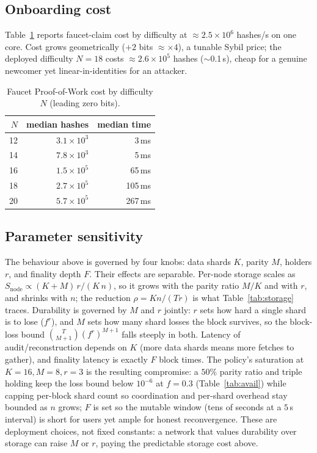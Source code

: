 \subsection{Onboarding cost}
Table~\ref{tab:pow} reports faucet-claim cost by difficulty at $\approx 2.5\times10^{6}$
hashes/s on one core. Cost grows geometrically ($+2$ bits $\approx \times4$), a tunable Sybil
price; the deployed difficulty $N{=}18$ costs $\approx 2.6\times10^{5}$ hashes ($\sim$0.1\,s),
cheap for a genuine newcomer yet linear-in-identities for an attacker.

\begin{table}[t]
\centering
\caption{Faucet Proof-of-Work cost by difficulty $N$ (leading zero bits).}
\label{tab:pow}
\begin{tabular}{rrr}
\toprule
$N$ & median hashes & median time \\
\midrule
12 & $3.1\times10^{3}$ & 3\,ms \\
14 & $7.8\times10^{3}$ & 5\,ms \\
16 & $1.5\times10^{5}$ & 65\,ms \\
18 & $2.7\times10^{5}$ & 105\,ms \\
20 & $5.7\times10^{5}$ & 267\,ms \\
\bottomrule
\end{tabular}
\end{table}

\subsection{Parameter sensitivity}
The behaviour above is governed by four knobs: data shards $K$, parity $M$, holders $r$, and
finality depth $F$. Their effects are separable. Per-node storage scales as
$S_{\text{node}}\propto (K{+}M)\,r/(K\,n)$, so it grows with the parity ratio $M/K$ and with $r$,
and shrinks with $n$; the reduction $\rho=Kn/(Tr)$ is what Table~\ref{tab:storage} traces. Durability
is governed by $M$ and $r$ jointly: $r$ sets how hard a single shard is to lose ($f^r$), and $M$
sets how many shard losses the block survives, so the block-loss bound
$\binom{T}{M+1}(f^{r})^{M+1}$ falls steeply in both. Latency of audit/reconstruction depends on $K$
(more data shards means more fetches to gather), and finality latency is exactly $F$ block times.
The policy's saturation at $K{=}16,M{=}8,r{=}3$ is the resulting compromise: a $50\%$ parity ratio
and triple holding keep the loss bound below $10^{-6}$ at $f{=}0.3$ (Table~\ref{tab:avail}) while
capping per-block shard count so coordination and per-shard overhead stay bounded as $n$ grows; $F$
is set so the mutable window (tens of seconds at a $5$\,s interval) is short for users yet ample for
honest reconvergence. These are deployment choices, not fixed constants: a network that values
durability over storage can raise $M$ or $r$, paying the predictable storage cost above.

